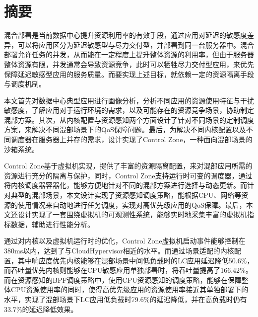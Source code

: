 
\maketitle%
\MAKETITLE%
\makedeclaration%
\intobmk\chapter*{摘\quad 要}%
\setcounter{page}{1}%



混合部署是当前数据中心提升资源利用率的有效手段，通过应用对延迟的敏感度差异，可以将应用区分为延迟敏感型与尽力交付型，并部署到同一台服务器中。混合部署允许任务的并发，从而能在一定程度上提升整体资源的利用率，但由于服务器整体资源有限，并发通常会导致资源竞争，此时可以牺牲尽力交付型应用，来优先保障延迟敏感型应用的服务质量。而要实现上述目标，就依赖一定的资源隔离手段与调度机制。

本文首先对数据中心典型应用进行画像分析，分析不同应用的资源使用特征与干扰敏感度，了解应用对于运行环境的需求，以及可能存在的资源竞争场景，协助制定混部方案。其次，从内核配置与资源感知两个方面设计了针对不同场景的定制调度方案，来解决不同混部场景下的QoS保障问题。最后，为解决不同内核配置以及不同调度器在服务器上并存的需求，设计实现了Control Zone，一种面向混部场景的沙箱系统。

Control Zone基于虚拟机实现，提供了丰富的资源隔离配置，来对混部应用所需的资源进行充分的隔离与保护，同时，Control Zone支持运行时可变的调度器，通过将内核调度器容器化，能够方便地针对不同的混部方案进行选择与动态更新。而针对典型的混部场景，本文设计实现了资源感知调度策略，能根据CPU、网络等资源的使用情况来自动地进行任务调度，实现对高优先级应用的QoS保障。最后，本文还设计实现了一套围绕虚拟机的可观测性系统，能够实时地采集丰富的虚拟机指标数据，辅助进行性能分析。


通过对内核以及虚拟机运行时的优化，Control Zone虚拟机启动事件能够控制在380ms以内，达到了与CloudHypervisor相近的水平。而通过场景适配的内核配置，其中响应度优先内核能够在混部场景中间低负载时的LC应用延迟降低50.6\%，而吞吐量优先内核则能够在CPU敏感应用单独部署时，将吞吐量提高了166.42\%。而在资源感知的BPF调度策略中，使用CPU资源感知的调度策略，能够在保障整体CPU资源使用率的同时，使得高优先级应用的资源使用率接近其单独部署下的水平，实现了混部场景下LC应用低负载时79.6\%的延迟降低，并在高负载时仍有33.7\%的延迟降低效果。

